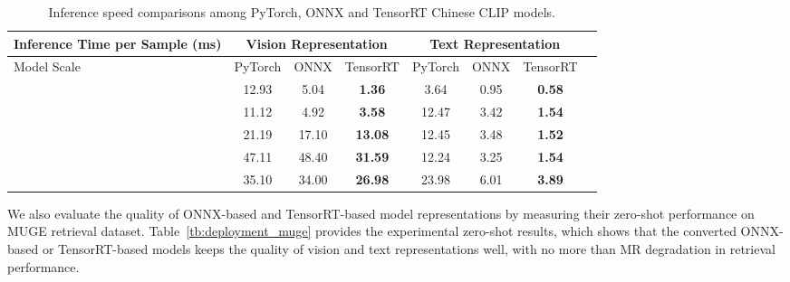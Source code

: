 \documentclass[11pt]{article}
\begin{document}
\begin{table*}[t]
\center
\small
\begin{adjustbox}{max width=1.\textwidth}
\begin{tabular}{@{\extracolsep{\fill}}lccccccc}
\toprule
  Inference Time per Sample (ms)
  &\multicolumn{3}{c}{Vision Representation}
  &\multicolumn{3}{c}{Text Representation}
  \\
\midrule
  Model Scale & PyTorch & ONNX & TensorRT & PyTorch & ONNX & TensorRT
  \\
\midrule
  
  & 12.93	& 5.04	& \textbf{1.36} & 	3.64 & 	0.95 &	\textbf{0.58}
  \\
  
  & 11.12	& 4.92	& \textbf{3.58}	& 12.47	& 3.42	& \textbf{1.54}
  \\
  
  & 21.19	& 17.10	& \textbf{13.08}	& 12.45	& 3.48	& \textbf{1.52}
  \\
  
  & 47.11	& 48.40	& \textbf{31.59}	& 12.24	& 3.25	& \textbf{1.54}
  \\
  
  & 35.10	& 34.00	& \textbf{26.98}	& 23.98	& 6.01	& \textbf{3.89}
  \\  

\bottomrule
\end{tabular}
\end{adjustbox}
\caption{Inference speed comparisons among PyTorch, ONNX and TensorRT Chinese CLIP models.}
\label{tb:deployment_speed}
\end{table*} 
We also evaluate the quality of ONNX-based and TensorRT-based model representations by measuring their zero-shot performance on MUGE retrieval dataset. Table~\ref{tb:deployment_muge} provides the experimental zero-shot results, which shows that the converted ONNX-based or TensorRT-based models keeps the quality of vision and text representations well, with no more than  MR degradation in retrieval performance.
\end{document}
